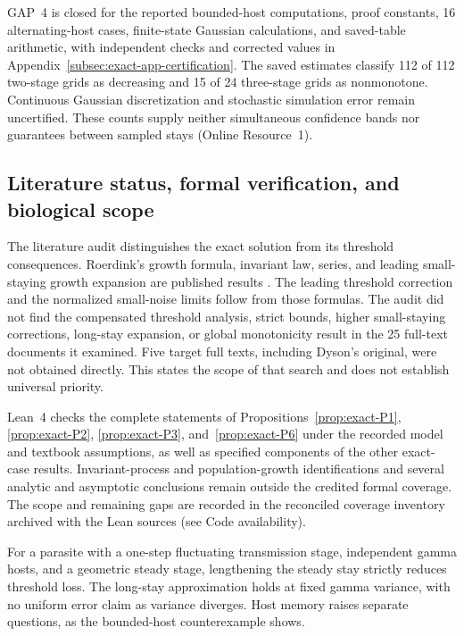 \begin{remark}\label{rem:exact-certification}
GAP~4 is closed for the reported bounded-host computations, proof constants, 16 alternating-host cases, finite-state Gaussian calculations, and saved-table arithmetic, with independent checks and corrected values in Appendix~\ref{subsec:exact-app-certification}. The saved estimates classify 112 of 112 two-stage grids as decreasing and 15 of 24 three-stage grids as nonmonotone. Continuous Gaussian discretization and stochastic simulation error remain uncertified. These counts supply neither simultaneous confidence bands nor guarantees between sampled stays (Online Resource~1).
\end{remark}

\subsection{Literature status, formal verification, and biological scope}\label{subsec:exact-scope}

The literature audit distinguishes the exact solution from its threshold consequences. Roerdink's growth formula, invariant law, series, and leading small-staying growth expansion are published results \citep{roerdink1988}. The leading threshold correction and the normalized small-noise limits follow from those formulas. The audit did not find the compensated threshold analysis, strict bounds, higher small-staying corrections, long-stay expansion, or global monotonicity result in the 25 full-text documents it examined. Five target full texts, including Dyson's original, were not obtained directly. This states the scope of that search and does not establish universal priority.

Lean~4 checks the complete statements of Propositions~\ref{prop:exact-P1}, \ref{prop:exact-P2}, \ref{prop:exact-P3}, and~\ref{prop:exact-P6} under the recorded model and textbook assumptions, as well as specified components of the other exact-case results. Invariant-process and population-growth identifications and several analytic and asymptotic conclusions remain outside the credited formal coverage. The scope and remaining gaps are recorded in the reconciled coverage inventory archived with the Lean sources (see Code availability).

For a parasite with a one-step fluctuating transmission stage, independent gamma hosts, and a geometric steady stage, lengthening the steady stay strictly reduces threshold loss. The long-stay approximation holds at fixed gamma variance, with no uniform error claim as variance diverges. Host memory raises separate questions, as the bounded-host counterexample shows.
